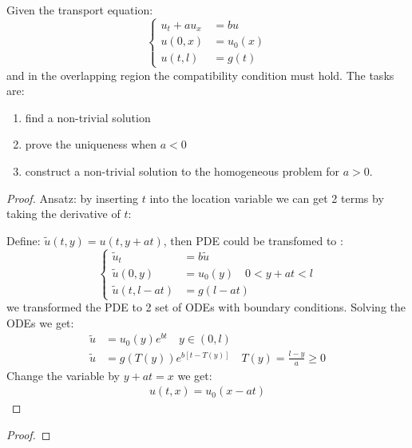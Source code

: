 \begin{exercise}
Given the transport equation:
\begin{equation}
\left\{
\begin{aligned}
u_t + au_x &= bu \\
u(0, x) &= u_0(x)\\
u(t, l) &= g(t)	
\end{aligned}
\right.	
\end{equation}
and in the overlapping region the compatibility condition must hold. The tasks are:
\begin{enumerate}
	\item find a non-trivial solution
	\item prove the uniqueness when $a < 0$
	\item construct a non-trivial solution to the homogeneous problem for $a > 0$. 
\end{enumerate}


\begin{proof}
Ansatz: by inserting $t$ into the location variable we can get 2 terms by taking the derivative of $t$:\par 
Define: $	\tilde{u}(t, y) = u(t, y + at)$, then PDE could be transfomed to :
\begin{equation}
\left\{
\begin{aligned}
	\tilde{u}_t &= b\tilde{u}\\
	\tilde{u}(0, y) &= u_0(y)\quad 0 < y + at < l \\
	\tilde{u}(t, l - at) &= g(l - at)
\end{aligned}
\right.	
\end{equation}
we transformed the PDE to 2 set of ODEs with boundary conditions. Solving the ODEs we get:
\begin{align*}
	\tilde{u} &= u_0(y) e^{bt} \quad y \in (0, l) \\
	\tilde{u} &= g(T(y)) e^{b[t - T(y)]} \quad T(y) = \frac{l - y}{a} \geq 0
\end{align*}
Change the variable by $y + at = x$ we get:
\begin{align*}
	u(t, x) = u_0(x - at)
\end{align*}
\end{proof}
\begin{proof}
\end{proof}


\end{exercise}
